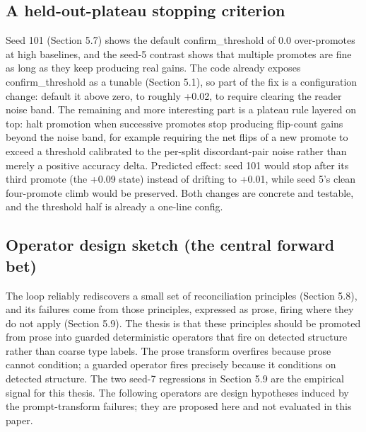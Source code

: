 \subsection{A held-out-plateau stopping criterion}
Seed 101 (Section 5.7) shows the default confirm\_threshold of 0.0 over-promotes at high baselines, and the seed-5 contrast shows that multiple promotes are fine as long as they keep producing real gains. The code already exposes confirm\_threshold as a tunable (Section 5.1), so part of the fix is a configuration change: default it above zero, to roughly +0.02, to require clearing the reader noise band. The remaining and more interesting part is a plateau rule layered on top: halt promotion when successive promotes stop producing flip-count gains beyond the noise band, for example requiring the net flips of a new promote to exceed a threshold calibrated to the per-split discordant-pair noise rather than merely a positive accuracy delta. Predicted effect: seed 101 would stop after its third promote (the +0.09 state) instead of drifting to +0.01, while seed 5's clean four-promote climb would be preserved. Both changes are concrete and testable, and the threshold half is already a one-line config.

\subsection{Operator design sketch (the central forward bet)}

The loop reliably rediscovers a small set of reconciliation principles (Section 5.8), and its failures come from those principles, expressed as prose, firing where they do not apply (Section 5.9). The thesis is that these principles should be promoted from prose into guarded deterministic operators that fire on detected structure rather than coarse type labels. The prose transform overfires because prose cannot condition; a guarded operator fires precisely because it conditions on detected structure. The two seed-7 regressions in Section 5.9 are the empirical signal for this thesis. The following operators are design hypotheses induced by the prompt-transform failures; they are proposed here and not evaluated in this paper.

